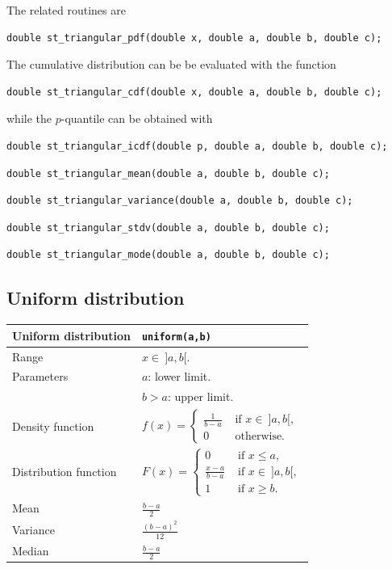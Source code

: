 \mbox{}

The related routines are
\begin{verbatim}
double st_triangular_pdf(double x, double a, double b, double c);
\end{verbatim}

The cumulative distribution can be be evaluated with the function
\begin{verbatim}
double st_triangular_cdf(double x, double a, double b, double c);
\end{verbatim}
while the $p$-quantile can be obtained with
\begin{verbatim}
double st_triangular_icdf(double p, double a, double b, double c);
\end{verbatim}

\begin{verbatim}
double st_triangular_mean(double a, double b, double c);
\end{verbatim}
\begin{verbatim}
double st_triangular_variance(double a, double b, double c);
\end{verbatim}
\begin{verbatim}
double st_triangular_stdv(double a, double b, double c);
\end{verbatim}
\begin{verbatim}
double st_triangular_mode(double a, double b, double c);
\end{verbatim}

\subsection{Uniform distribution}

\noindent
\begin{tabularx}{\textwidth}{lX}
Uniform distribution & \verb|uniform(a,b)| \\
\hline
Range & $x \in\ ]a, b[$. \\
Parameters & $a$: lower limit. \\
& $b > a$: upper limit. \\
Density function &
$f(x) =
\begin{cases}
\frac{1}{b-a} & \mbox{ if } x \in\ ]a,b[,\\
0 & \mbox{ otherwise.}
\end{cases}$\\
Distribution function &
$F(x) =
\begin{cases}
0 & \mbox{ if } x \leq a,\\
\frac{x-a}{b-a} & \mbox{ if } x \in\ ]a,b[,\\
1 & \mbox{ if } x \geq b.
\end{cases}$\\
Mean & $\frac{b-a}{2}$ \\
Variance & $\frac{(b-a)^2}{12}$ \\
Median & $\frac{b-a}{2}$ \\
\hline
\end{tabularx}

